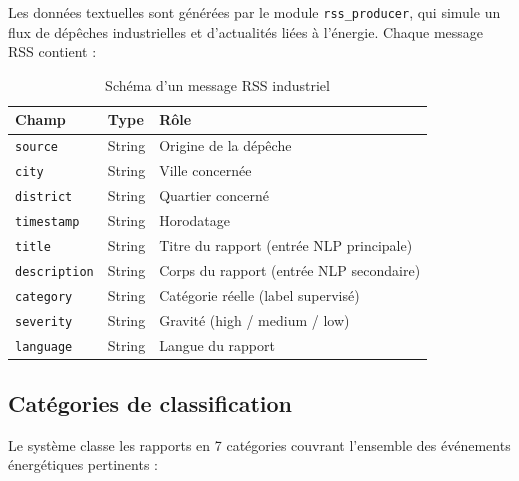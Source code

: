 \documentclass[1pt,a4paper]{report}
\begin{document}
Les donn\'{e}es textuelles sont g\'{e}n\'{e}r\'{e}es par le module \texttt{rss\_producer}, qui simule un flux de d\'{e}p\^{e}ches industrielles et d'actualit\'{e}s li\'{e}es \`{a} l'\'{e}nergie. Chaque message RSS contient :

\begin{table}[H]
\centering
\caption{Sch\'{e}ma d'un message RSS industriel}
\label{tab:rss_schema}
\renewcommand{\arraystretch}{1.3}
\begin{tabularx}{\textwidth}{|l|l|X|}
\hline
\rowcolor{primaryblue!20}
\textbf{Champ} & \textbf{Type} & \textbf{R\^{o}le} \\
\hline
\texttt{source} & String & Origine de la d\'{e}p\^{e}che \\
\texttt{city} & String & Ville concern\'{e}e \\
\texttt{district} & String & Quartier concern\'{e} \\
\texttt{timestamp} & String & Horodatage \\
\texttt{title} & String & Titre du rapport (entr\'{e}e NLP principale) \\
\texttt{description} & String & Corps du rapport (entr\'{e}e NLP secondaire) \\
\texttt{category} & String & Cat\'{e}gorie r\'{e}elle (label supervis\'{e}) \\
\texttt{severity} & String & Gravit\'{e} (high / medium / low) \\
\texttt{language} & String & Langue du rapport \\
\hline
\end{tabularx}
\end{table}

\subsection{Cat\'{e}gories de classification}

Le syst\`{e}me classe les rapports en 7 cat\'{e}gories couvrant l'ensemble des \'{e}v\'{e}nements \'{e}nerg\'{e}tiques pertinents :
\end{document}
